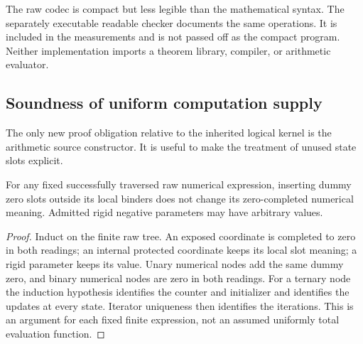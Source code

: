 The raw codec is compact but less legible than the mathematical syntax.
The separately executable readable checker documents the same operations.
It is included in the measurements and is not passed off as the compact
program. Neither implementation imports a theorem library, compiler, or
arithmetic evaluator.

\subsection{Soundness of uniform computation supply}

The only new proof obligation relative to the inherited logical kernel is
the arithmetic source constructor. It is useful to make the treatment of
unused state slots explicit.

\begin{lemma}
For any fixed successfully traversed raw numerical expression, inserting
dummy zero slots outside its local binders does not change its
zero-completed numerical meaning. Admitted rigid negative parameters may
have arbitrary values.
\end{lemma}
\begin{proof}
Induct on the finite raw tree. An exposed coordinate is completed to zero
in both readings; an internal protected coordinate keeps its local slot
meaning; a rigid parameter keeps its value. Unary numerical nodes add the
same dummy zero, and binary numerical nodes are zero in both readings.
For a ternary node the induction hypothesis identifies the counter and
initializer and identifies the updates at every state. Iterator uniqueness
then identifies the iterations. This is an argument for each fixed finite
expression, not an assumed uniformly total evaluation function.
\end{proof}

